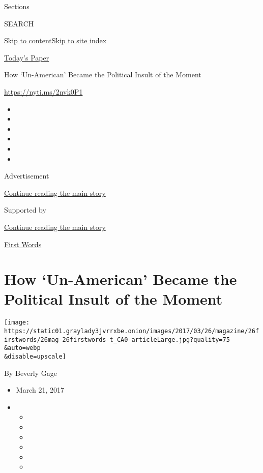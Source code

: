Sections

SEARCH

\protect\hyperlink{site-content}{Skip to
content}\protect\hyperlink{site-index}{Skip to site index}

\href{https://myaccount.nytimes3xbfgragh.onion/auth/login?response_type=cookie\&client_id=vi}{}

\href{https://www.nytimes3xbfgragh.onion/section/todayspaper}{Today's
Paper}

How `Un-American' Became the Political Insult of the Moment

\url{https://nyti.ms/2nvk0P1}

\begin{itemize}
\item
\item
\item
\item
\item
\item
\end{itemize}

Advertisement

\protect\hyperlink{after-top}{Continue reading the main story}

Supported by

\protect\hyperlink{after-sponsor}{Continue reading the main story}

\href{/column/first-words}{First Words}

\hypertarget{how-un-american-became-the-political-insult-of-the-moment}{%
\section{How `Un-American' Became the Political Insult of the
Moment}\label{how-un-american-became-the-political-insult-of-the-moment}}

\texttt{[image: https://static01.graylady3jvrrxbe.onion/images/2017/03/26/magazine/26firstwords/26mag-26firstwords-t\_CA0-articleLarge.jpg?quality=75\\\&auto=webp\\\&disable=upscale]}

By Beverly Gage

\begin{itemize}
\item
  March 21, 2017
\item
  \begin{itemize}
  \item
  \item
  \item
  \item
  \item
  \item
  \end{itemize}
\end{itemize}

